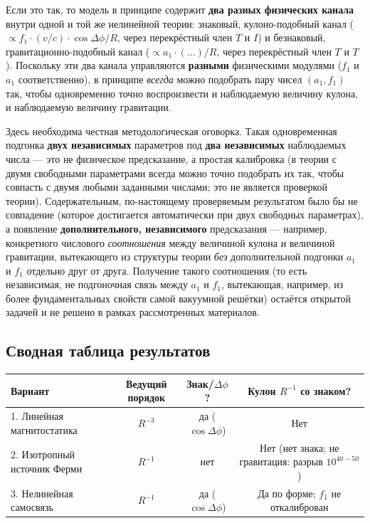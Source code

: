\documentclass[12pt,a4paper]{article}
\begin{document}
Если это так, то модель в принципе содержит \textbf{два разных
физических канала} внутри одной и той же нелинейной теории:
знаковый, кулоно-подобный канал ($\propto f_1\cdot(v/c)\cdot\cos\Delta\phi/R$,
через перекрёстный член $T$ и $I$) и безнаковый, гравитационно-подобный
канал ($\propto a_1\cdot(\ldots)/R$, через перекрёстный член $T$ и
$T$). Поскольку эти два канала управляются \textbf{разными}
физическими модулями ($f_1$ и $a_1$ соответственно), в принципе
\emph{всегда} можно подобрать пару чисел $(a_1,f_1)$ так, чтобы
одновременно точно воспроизвести и наблюдаемую величину кулона, и
наблюдаемую величину гравитации.

Здесь необходима честная методологическая оговорка. Такая
одновременная подгонка \textbf{двух независимых} параметров под
\textbf{два независимых} наблюдаемых числа --- это не физическое
предсказание, а простая калибровка (в теории с двумя свободными
параметрами всегда можно точно подобрать их так, чтобы совпасть с
двумя любыми заданными числами; это не является проверкой теории).
Содержательным, по-настоящему проверяемым результатом было бы не
совпадение (которое достигается автоматически при двух свободных
параметрах), а появление \textbf{дополнительного, независимого}
предсказания --- например, конкретного числового \emph{соотношения}
между величиной кулона и величиной гравитации, вытекающего из
структуры теории \emph{без} дополнительной подгонки $a_1$ и $f_1$
отдельно друг от друга. Получение такого соотношения (то есть
независимая, не подгоночная связь между $a_1$ и $f_1$, вытекающая,
например, из более фундаментальных свойств самой вакуумной решётки)
остаётся открытой задачей и не решено в рамках рассмотренных
материалов.

\subsection{Сводная таблица результатов}

\begin{center}
\begin{tabular}{|l|c|c|c|}
\hline
Вариант & Ведущий порядок & Знак/$\Delta\phi$? & Кулон $R^{-1}$ со знаком? \\
\hline
1. Линейная магнитостатика & $R^{-3}$ & да ($\cos\Delta\phi$) & Нет \\
2. Изотропный источник Ферми & $R^{-1}$ & нет & Нет (нет знака; не гравитация: разрыв $10^{40-50}$) \\
3. Нелинейная самосвязь & $R^{-1}$ & да ($\cos\Delta\phi$) & Да по форме; $f_1$ не откалиброван \\
\hline
\end{tabular}
\end{center}
\end{document}

